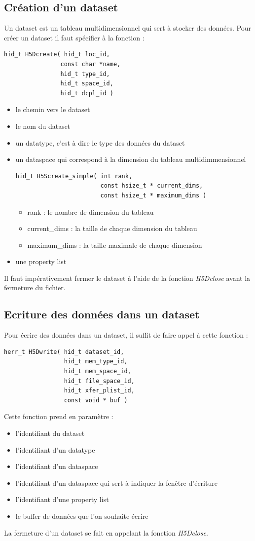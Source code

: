 \documentclass[12pt]{article}
\begin{document}
\subsection {Création d'un dataset}
Un dataset est un tableau multidimensionnel qui sert à stocker des données. \newline
Pour créer un dataset il faut spécifier à la fonction :
\begin{verbatim}
hid_t H5Dcreate( hid_t loc_id, 
                const char *name, 
                hid_t type_id, 
                hid_t space_id, 
                hid_t dcpl_id )
\end{verbatim}
\begin{itemize}
\item le chemin vers le dataset
\item le nom du dataset
\item un datatype, c'est à dire le type des données du dataset
\item un dataspace qui correspond à la dimension du tableau multidimmensionnel
\begin{verbatim}
hid_t H5Screate_simple( int rank, 
                        const hsize_t * current_dims, 
                        const hsize_t * maximum_dims )
\end{verbatim}
\begin{itemize}
\item rank : le nombre de dimension du tableau
\item current\_dims : la taille de chaque dimension du tableau
\item maximum\_dims : la taille maximale de chaque dimension
\end{itemize}
\item une property list
\end{itemize}
Il faut impérativement fermer le dataset à l'aide de la fonction \emph{H5Dclose} avant la fermeture du fichier. 
\subsection {Ecriture des données dans un dataset}
Pour écrire des données dans un dataset, il suffit de faire appel à cette fonction :
\begin{verbatim}
herr_t H5Dwrite( hid_t dataset_id,  
                 hid_t mem_type_id, 
                 hid_t mem_space_id, 
                 hid_t file_space_id, 
                 hid_t xfer_plist_id, 
                 const void * buf )
\end{verbatim}
Cette fonction prend en paramètre :
\begin{itemize}
\item l'identifiant du dataset
\item l'identifiant d'un datatype
\item l'identifiant d'un dataspace
\item l'identifiant d'un dataspace qui sert à indiquer la fenêtre d'écriture
\item l'identifiant d'une property list
\item le buffer de données que l'on souhaite écrire
\end{itemize}
La fermeture d'un dataset se fait en appelant la fonction \emph{H5Dclose}.
\end{document}
